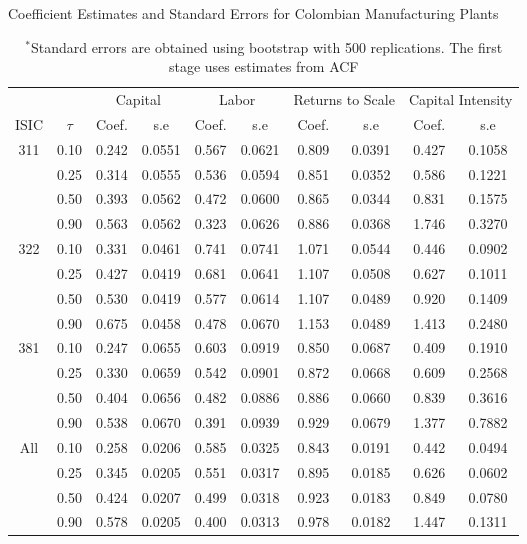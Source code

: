 \documentclass[12pt]{article}
\begin{document}
\begin{table}[H]
\centering
\caption{Coefficient Estimates and Standard Errors for Colombian Manufacturing Plants}
\small
\begin{tabular}{cccccccccc}
  \hline\hline & & \multicolumn{2}{c}{Capital}  & \multicolumn{2}{c}{Labor} & \multicolumn{2}{c}{Returns to Scale} & \multicolumn{2}{c}{Capital Intensity}\\ \cmidrule(lr){3-4} \cmidrule(lr){5-6} \cmidrule(lr){7-8} \cmidrule(lr){9-10}ISIC & $\tau$ & Coef. & s.e & Coef. & s.e & Coef. & s.e & Coef. & s.e \\ 
  \hline
311 & 0.10 & 0.242 & 0.0551 & 0.567 & 0.0621 & 0.809 & 0.0391 & 0.427 & 0.1058 \\ 
   & 0.25 & 0.314 & 0.0555 & 0.536 & 0.0594 & 0.851 & 0.0352 & 0.586 & 0.1221 \\ 
   & 0.50 & 0.393 & 0.0562 & 0.472 & 0.0600 & 0.865 & 0.0344 & 0.831 & 0.1575 \\ 
   & 0.90 & 0.563 & 0.0562 & 0.323 & 0.0626 & 0.886 & 0.0368 & 1.746 & 0.3270 \\ 
  322 & 0.10 & 0.331 & 0.0461 & 0.741 & 0.0741 & 1.071 & 0.0544 & 0.446 & 0.0902 \\ 
   & 0.25 & 0.427 & 0.0419 & 0.681 & 0.0641 & 1.107 & 0.0508 & 0.627 & 0.1011 \\ 
   & 0.50 & 0.530 & 0.0419 & 0.577 & 0.0614 & 1.107 & 0.0489 & 0.920 & 0.1409 \\ 
   & 0.90 & 0.675 & 0.0458 & 0.478 & 0.0670 & 1.153 & 0.0489 & 1.413 & 0.2480 \\ 
  381 & 0.10 & 0.247 & 0.0655 & 0.603 & 0.0919 & 0.850 & 0.0687 & 0.409 & 0.1910 \\ 
   & 0.25 & 0.330 & 0.0659 & 0.542 & 0.0901 & 0.872 & 0.0668 & 0.609 & 0.2568 \\ 
   & 0.50 & 0.404 & 0.0656 & 0.482 & 0.0886 & 0.886 & 0.0660 & 0.839 & 0.3616 \\ 
   & 0.90 & 0.538 & 0.0670 & 0.391 & 0.0939 & 0.929 & 0.0679 & 1.377 & 0.7882 \\ 
  All & 0.10 & 0.258 & 0.0206 & 0.585 & 0.0325 & 0.843 & 0.0191 & 0.442 & 0.0494 \\ 
   & 0.25 & 0.345 & 0.0205 & 0.551 & 0.0317 & 0.895 & 0.0185 & 0.626 & 0.0602 \\ 
   & 0.50 & 0.424 & 0.0207 & 0.499 & 0.0318 & 0.923 & 0.0183 & 0.849 & 0.0780 \\ 
   & 0.90 & 0.578 & 0.0205 & 0.400 & 0.0313 & 0.978 & 0.0182 & 1.447 & 0.1311 \\ 
   \hline
\end{tabular}
\caption*{\footnotesize $^{*}$Standard errors are obtained using bootstrap with 500 replications. The first stage uses estimates from ACF}
\label{COLQACF}
\end{table}
\end{document}
